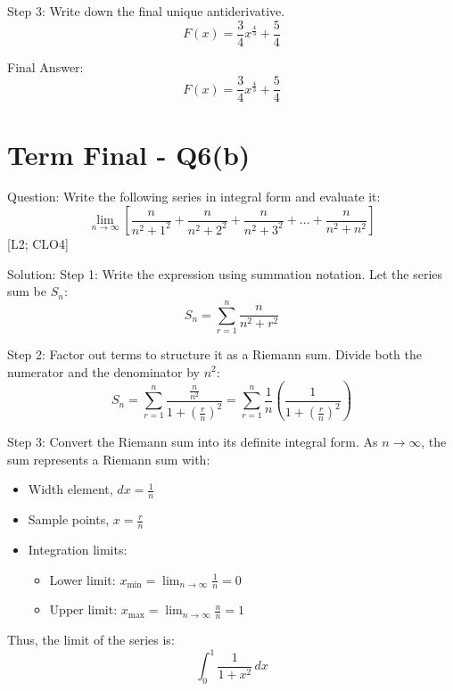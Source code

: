 \documentclass[11pt, a4paper]{article}
\begin{document}
Step 3: Write down the final unique antiderivative.
\[
F(x) = \frac{3}{4} x^{\frac{4}{3}} + \frac{5}{4}
\]

Final Answer:
\[
\boxed{F(x) = \frac{3}{4}x^{\frac{4}{3}} + \frac{5}{4}}
\]





\section*{Term Final - Q6(b)}

Question:
Write the following series in integral form and evaluate it:
\[
\lim_{n \to \infty} \left[ \frac{n}{n^2 + 1^2} + \frac{n}{n^2 + 2^2} + \frac{n}{n^2 + 3^2} + \dots + \frac{n}{n^2 + n^2} \right]
\]
[L2; CLO4]

Solution:
Step 1: Write the expression using summation notation.
Let the series sum be $S_n$:
\[
S_n = \sum_{r=1}^{n} \frac{n}{n^2 + r^2}
\]

Step 2: Factor out terms to structure it as a Riemann sum.
Divide both the numerator and the denominator by $n^2$:
\[
S_n = \sum_{r=1}^{n} \frac{\frac{n}{n^2}}{1 + \left(\frac{r}{n}\right)^2} = \sum_{r=1}^{n} \frac{1}{n} \left( \frac{1}{1 + \left(\frac{r}{n}\right)^2} \right)
\]

Step 3: Convert the Riemann sum into its definite integral form.
As $n \to \infty$, the sum represents a Riemann sum with:
\begin{itemize}
    \item Width element, $dx = \frac{1}{n}$
    \item Sample points, $x = \frac{r}{n}$
    \item Integration limits:
    \begin{itemize}
        \item Lower limit: $x_{\text{min}} = \lim_{n \to \infty} \frac{1}{n} = 0$
        \item Upper limit: $x_{\text{max}} = \lim_{n \to \infty} \frac{n}{n} = 1$
    \end{itemize}
\end{itemize}
Thus, the limit of the series is:
\[
\int_{0}^{1} \frac{1}{1 + x^2} \, dx
\]
\end{document}
